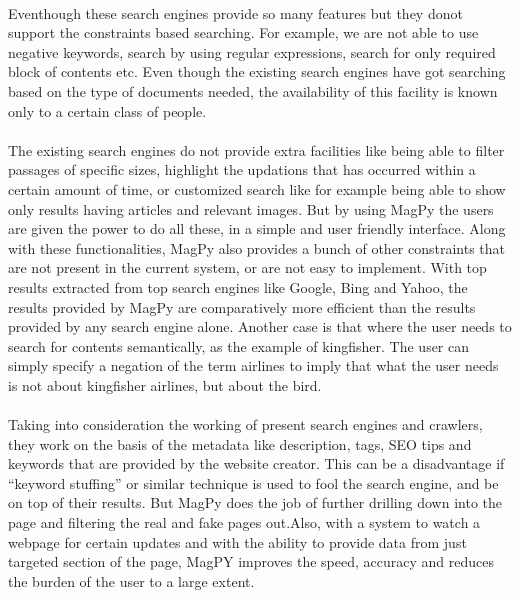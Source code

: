 \documentclass[a4paper]{report}
\begin{document}
\paragraph{}
\large\textnormal{Eventhough these search engines provide so many features but they  donot support the constraints based searching. For example, we are not able to use negative keywords, search by using regular expressions, search for only required block of contents etc. Even though the existing search engines have got searching based on the type of documents needed, the availability of this facility is known only to a certain class of people.}

\paragraph{}
\large\textnormal{The existing search engines do not provide extra facilities like being able to filter passages of specific sizes, highlight the updations that has occurred within a certain amount of time, or customized search like for example being able to show only results having articles and relevant images. But by using MagPy the users are given the power to do all these, in a simple and user friendly interface. Along with these functionalities, MagPy also provides a bunch of other constraints that are not present in the current system, or are not easy to implement. With top results extracted from top search engines like Google, Bing and Yahoo, the results provided by MagPy are comparatively more efficient than the results provided by any search engine alone. Another case is that where the user needs to search for contents semantically, as the example of kingfisher. The user can simply specify a negation of the term airlines to imply that what the user needs is not about kingfisher airlines, but about the bird.}

\paragraph{}
\large\textnormal{Taking into consideration the working of present search engines and crawlers, they work on the basis of the metadata like description, tags, SEO tips and keywords that are provided by the website creator. This can be a disadvantage if “keyword stuffing” or similar technique is used to fool the search engine, and be on top of their results. But MagPy does the job of further drilling down into the page and filtering the real and fake pages out.Also, with a system to watch a webpage for certain updates and with the ability to provide data from just targeted section of the page, MagPY improves the speed, accuracy and reduces the burden of the user to a large extent.}
\end{document}
